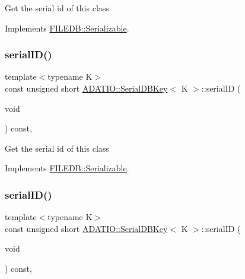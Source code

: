 Get the serial id of this class 

Implements \mbox{\hyperlink{classFILEDB_1_1Serializable_a5d639b5dbd5d8ebc7dca1eca31bbc868}{F\+I\+L\+E\+D\+B\+::\+Serializable}}.

\mbox{\label{classADATIO_1_1SerialDBKey_a0d088e08f453fd38a906208783f788d7}} 
\subsubsection{\texorpdfstring{serialID()}{serialID()}\hspace{0.1cm}{\footnotesize\ttfamily [2/3]}}
{\footnotesize\ttfamily template$<$typename K$>$ \\
const unsigned short \mbox{\hyperlink{classADATIO_1_1SerialDBKey}{A\+D\+A\+T\+I\+O\+::\+Serial\+D\+B\+Key}}$<$ K $>$\+::serial\+ID (\begin{DoxyParamCaption}\item[{void}]{ }\end{DoxyParamCaption}) const\hspace{0.3cm}{\ttfamily [inline]}, {\ttfamily [virtual]}}

Get the serial id of this class 

Implements \mbox{\hyperlink{classFILEDB_1_1Serializable_a5d639b5dbd5d8ebc7dca1eca31bbc868}{F\+I\+L\+E\+D\+B\+::\+Serializable}}.

\mbox{\label{classADATIO_1_1SerialDBKey_a0d088e08f453fd38a906208783f788d7}} 
\subsubsection{\texorpdfstring{serialID()}{serialID()}\hspace{0.1cm}{\footnotesize\ttfamily [3/3]}}
{\footnotesize\ttfamily template$<$typename K$>$ \\
const unsigned short \mbox{\hyperlink{classADATIO_1_1SerialDBKey}{A\+D\+A\+T\+I\+O\+::\+Serial\+D\+B\+Key}}$<$ K $>$\+::serial\+ID (\begin{DoxyParamCaption}\item[{void}]{ }\end{DoxyParamCaption}) const\hspace{0.3cm}{\ttfamily [inline]}, {\ttfamily [virtual]}}

